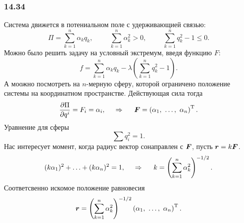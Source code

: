 \subsubsection*{14.34}


Система движется в потениальном поле с удерживающией связью:
\begin{equation*}
    \Pi = \sum_{k=1}^n \alpha_k q_k, \hspace{1cm} 
    \sum_{k=1}^n\alpha_k^2 > 0, \hspace{1cm} 
    \sum_{k=1}^n q_k^2 - 1 \leq 0.
\end{equation*}
Можно было решить задачу на условный экстремум, введя функцию $F$:
\begin{equation*}
    f = \sum_{k=1}^n \alpha_k q_k - \lambda \left(
        \sum_{k=1}^n q_k^2 - 1
    \right).
\end{equation*}
А моожно посмотреть на $n$-мерную сферу, которой ограничено положение системы на координатном пространстве. Действующая сила тогда
\begin{equation*}
    \frac{\partial \Pi}{\partial q^i} = F_i = \alpha_i,
    \hspace{0.5cm} \Rightarrow \hspace{0.5cm} 
    \mbox{\boldmath $F$} = \left(\alpha_1, \ \ldots,\  \alpha_n\right)^{\text{T}}.
\end{equation*}
Уравнение для сферы
\begin{equation*}
    \sum q_i^2 = 1.
\end{equation*}
Нас интересует момент, когда радиус вектор сонаправлен с $\mbox{\boldmath $F$}$, пусть $\mbox{\boldmath $r$} = k \mbox{\boldmath $F$}$.
\begin{equation*}
    (k \alpha_1)^2 + \ldots + (k \alpha_n)^2 = 1,
    \hspace{0.5cm} \Rightarrow \hspace{0.5cm} 
    k = \left(
        \sum_{k=1}^n \alpha_k^2
    \right)^{-1/2}.
\end{equation*}
Соответсвенно искомое положение равновесия
\begin{equation}
    \vc{r} = \left(
        \sum_{k=1}^n \alpha_k^2
    \right)^{-1/2} \left(\alpha_1,\  \ldots, \ \alpha_n\right)\T.
\end{equation}